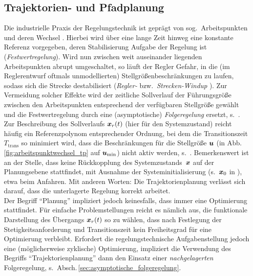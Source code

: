\subsection{Trajektorien- und Pfadplanung} \label{sec:begriff_tp}
Die industrielle Praxis der Regelungstechnik ist geprägt von sog.\ Arbeitspunkten und deren Wechsel \cite{lunze2005regelungstechnik, hagenmeyer2004flachheitsbasierter}. Hierbei wird über eine lange Zeit hinweg eine konstante Referenz vorgegeben, deren Stabilisierung Aufgabe der Regelung ist (\emph{Festwertregelung}). Wird nun zwischen weit auseinander liegenden Arbeitspunkten abrupt umgeschaltet, so läuft der Regler Gefahr, in die (im Reglerentwurf oftmals unmodellierten) Stellgrößenbeschränkungen zu laufen, sodass sich die Strecke destabilisiert (\emph{Regler-} bzw.\ \emph{Strecken-Windup} \cite{hippe2004neue}). Zur Vermeidung solcher Effekte %
wird der zeitliche Sollverlauf der Führungsgröße zwischen den Arbeitspunkten entsprechend der verfügbaren Stellgröße gewählt \cite{hagenmeyer2004flachheitsbasierter} und die Festwertregelung durch eine (asymptotische) \emph{Folgeregelung} ersetzt, s.\ . Zur Beschreibung des Sollverlaufs $\boldsymbol{x}_r(t)$ (hier für den Systemzustand) reicht häufig ein Referenzpolynom entsprechender Ordnung, bei dem die Transitionszeit $T_\text{trans}$ so minimiert wird, dass die Beschränkungen für die Stellgröße $\boldsymbol{u}$ (in Abb.\,\ref{fig:arbeitspunktwechsel_tp} auf $\boldsymbol{u}_{\min}$) nicht aktiv werden, s.\ \zB \cite{zeitz2010differenzielle}. %
Bemerkenswert ist an der Stelle, dass keine Rückkopplung des Systemzustands~$\boldsymbol{x}$ auf der Planungsebene stattfindet, mit Ausnahme der Systeminitialisierung (s.\ $\boldsymbol{x}_0$ in ), etwa beim Anfahren. Mit anderen Worten: Die Trajektorienplanung verlässt sich darauf, dass die unterlagerte Regelung korrekt arbeitet.\\
Der Begriff "`Planung"' impliziert jedoch keinesfalls, dass immer eine Optimierung stattfindet. Für einfache Problemstellungen reicht es nämlich aus, die funktionale Darstellung des Übergangs $\boldsymbol{x}_r(t)$ so zu wählen, dass nach Festlegung der Stetigkeitsanforderung und Transitionszeit kein Freiheitsgrad für eine Optimierung verbleibt. Erfordert die regelungstechnische Aufgabenstellung jedoch eine (möglicherweise zyklische) Optimierung, impliziert die Verwendung des Begriffs "`Trajektorienplanung"' dann \iA den Einsatz einer \emph{nachgelagerten} Folgeregelung, s.\ Absch.\,\ref{sec:asymptotische_folgeregelung}.\\

